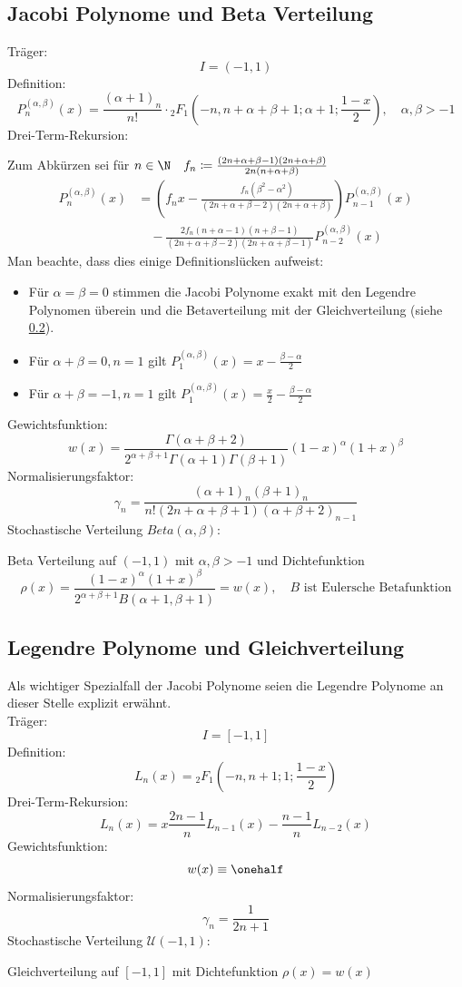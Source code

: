 \subsection{Jacobi Polynome und Beta Verteilung}
Träger:
\[I=(-1,1)\]
Definition:
\[P_n^{(\alpha, \beta)}(x)=\frac{(\alpha + 1)_n}{n!}\cdot {_2F_1}\left(-n,n+\alpha+\beta+1;\alpha+1;\frac{1-x}{2}\right),\quad \alpha,\beta>-1\]
Drei-Term-Rekursion:
\begin{center}
Zum Abkürzen sei für $n\in\N\quad f_n \coloneqq \frac{(2n + \alpha + \beta - 1)(2n + \alpha + \beta)}{2n(n + \alpha + \beta)}$
\begin{align*}
P_n^{(\alpha, \beta)}(x)&=\left(f_nx-\frac{f_n(\beta^2-\alpha^2)}{(2n + \alpha + \beta - 2)(2n + \alpha +\beta)}\right)P_{n-1}^{(\alpha, \beta)}(x)\\
&\quad-\frac{2f_n(n + \alpha - 1)(n + \beta - 1)}{(2n + \alpha + \beta - 2)(2n + \alpha + \beta - 1)}P_{n-2}^{(\alpha, \beta)}(x)
\end{align*}
Man beachte, dass dies einige Definitionslücken aufweist:
\begin{itemize}
\item Für $\alpha=\beta=0$ stimmen die Jacobi Polynome exakt mit den Legendre Polynomen überein und die Betaverteilung mit der Gleichverteilung (siehe \ref{seclegendre}).
\item Für $\alpha+\beta=0,n=1$ gilt $P_1^{(\alpha,\beta)}(x)=x-\frac{\beta-\alpha}{2}$
\item Für $\alpha+\beta=-1,n=1$ gilt $P_1^{(\alpha,\beta)}(x)=\frac{x}{2}-\frac{\beta-\alpha}{2}$
\end{itemize}
\end{center}
Gewichtsfunktion:
\[w(x)=\frac{\Gamma(\alpha+\beta+2)}{2^{\alpha+\beta+1}\Gamma(\alpha+1)\Gamma(\beta+1)}(1-x)^\alpha(1+x)^\beta\]
Normalisierungsfaktor:
\[\gamma_n=\frac{(\alpha+1)_n(\beta+1)_n}{n!(2n+\alpha+\beta+1)(\alpha+\beta+2)_{n-1}}\]
Stochastische Verteilung $Beta(\alpha,\beta)$:
\begin{center}
Beta Verteilung auf $(-1,1)$ mit $\alpha,\beta>-1$ und Dichtefunktion
\[\rho(x)=\frac{(1 - x)^\alpha(1 + x)^\beta}{2^{\alpha + \beta + 1}B(\alpha+1,\beta+1)}=w(x),\quad B\text{ ist Eulersche Betafunktion}\]
\end{center}

\subsection{Legendre Polynome und Gleichverteilung}
\label{seclegendre}
Als wichtiger Spezialfall der Jacobi Polynome seien die Legendre Polynome an dieser Stelle explizit erwähnt.\\
Träger:
\[I=[-1,1]\]
Definition:
\[L_n(x)={_2F_1}\left(-n,n+1;1;\frac{1-x}{2}\right)\]
Drei-Term-Rekursion:
\[L_{n}(x)=x\frac{2n-1}{n}L_{n-1}(x)-\frac{n-1}{n}L_{n-2}(x)\]
Gewichtsfunktion:
\[w(x)\equiv \onehalf\]
Normalisierungsfaktor:
\[\gamma_n=\frac{1}{2n+1}\]
Stochastische Verteilung $\mathcal{U}(-1,1)$:
\begin{center}
Gleichverteilung auf $[-1,1]$ mit Dichtefunktion $\rho(x)=w(x)$
\end{center}
